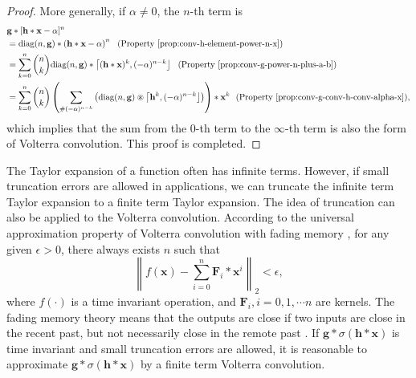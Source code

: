 \documentclass[twoside,11pt]{article}
\def\oconv{\circledast}
\def\dsmark{{\scriptstyle \#}}
\def\diag{\text{diag}}
\def\tvar#1{\mathbf{#1}} %
\def\lcerfl#1{\left\lceil{#1}\right\rfloor}
\begin{document}
\begin{proof}
  More generally, if \(\alpha \ne 0\), the \(n\)-th term is
  \begin{equation*}
    \begin{aligned}
       & \tvar{g} * [\tvar{h} * \tvar{x} - \alpha]^n                                                                                 \\
       & = \diag(n, \tvar{g}) * \left(\tvar{h} * \tvar{x} - \alpha\right)^n ~~ (\text{Property \ref{prop:conv-h-element-power-n-x}}) \\
       & = \sum_{k=0}^{n} \binom{n}{k} \diag(n, \tvar{g}) * \lcerfl{(\tvar{h} * \tvar{x})^k,  (- \alpha)^{n-k}}
      ~~ (\text{Property \ref{prop:conv-g-power-n-plus-a-b}})                                                                        \\
       & = \sum_{k=0}^{n} \binom{n}{k}
      \left( \sum_{\dsmark (-\alpha)^{n-k}} \left(\diag(n, \tvar{g}) \oconv \lcerfl{\tvar{h}^k, (-\alpha)^{n-k}} \right)  \right) * \tvar{x}^k
      ~~ (\text{Property \ref{prop:conv-g-conv-h-conv-alpha-x}}),                                                                    \\
    \end{aligned}
  \end{equation*}
  which implies that the sum from the \(0\)-th term to the \(\infty\)-th term is also the form of Volterra convolution.
  This proof is completed.
\end{proof}

The Taylor expansion of a function often has infinite terms. However, if small truncation errors are allowed in applications, we can truncate the infinite term Taylor expansion to a finite term Taylor expansion.
The idea of truncation can also be applied to the Volterra convolution.
According to the universal approximation property of Volterra convolution with fading memory \citep{Boyd1985}, for any given \(\epsilon > 0\), there always exists \(n\) such that
\begin{equation*}
  \left\| f(\tvar{x}) - \sum_{i=0}^{n} \tvar{F}_i * \tvar{x}^i \right\|_2 < \epsilon,
\end{equation*}
where \(f(\cdot)\) is a time invariant operation, and \(\tvar{F}_i, i = 0, 1, \cdots n\) are kernels.
The fading memory theory means that the outputs are close if two inputs are close in the recent past, but not necessarily close in the remote past \citep{Boyd1985}.
If \(\tvar{g} * \sigma(\tvar{h} * \tvar{x})\) is time invariant and small truncation errors are allowed, it is reasonable to approximate \(\tvar{g} * \sigma(\tvar{h} * \tvar{x})\) by a finite term Volterra convolution.
\end{document}
